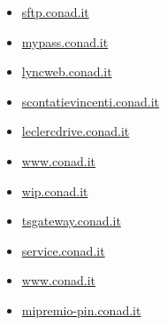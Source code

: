 \documentclass{article}
\begin{document}
\begin{itemize}
        \item \href{ http://sftp.conad.it }{ sftp.conad.it }
    
        
        
        \item \href{ https://mypass.conad.it/mypass/ }{ mypass.conad.it }
    
        
        
        \item \href{ https://lyncweb.conad.it/ }{ lyncweb.conad.it }
    
        
        
        \item \href{ https://scontatievincenti.conad.it/ }{ scontatievincenti.conad.it }
    
        
        
        \item \href{ http://leclercdrive.conad.it/ }{ leclercdrive.conad.it }
    
        
        
        \item \href{ https://www.conad.it/ }{ www.conad.it }
    
        
        
        \item \href{ http://wip.conad.it/ }{ wip.conad.it }
    
        
        
        \item \href{ https://tsgateway.conad.it/RDWeb/Pages/en-US/login.aspx?ReturnUrl=/RDWeb/Pages/en-US/Default.aspx }{ tsgateway.conad.it }
    
        
        
        \item \href{ http://service.conad.it }{ service.conad.it }
    
        
        
        \item \href{ https://www.conad.it/carte-e-premi?utm\_campaign=sitelink\&utm\_source=google\&utm\_medium=cpc\&utm\_source=google\&utm\_medium=cpc\&utm\_campaign=cnd\_wpp\_conad\_search\&s\_kwcid=AL\%2113157\%213\%21528959599834\%21e\%21\%21g\%21\%21premi+conad\&gad\_source=1\&gclid=EAIaIQobChMI76fVy4GygwMVeZmDBx3UvwasEAAYASABEgI5f\_D\_BwE }{ www.conad.it }
    
        
        
        \item \href{ http://mipremio-pin.conad.it/ }{ mipremio-pin.conad.it }
    

\end{itemize}
\end{document}
